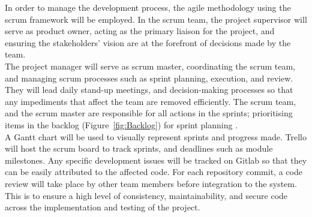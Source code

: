 
In order to manage the development process, the agile methodology using the scrum framework will be employed. In the scrum team, the project supervisor will serve as product owner, acting as the primary liaison for the project, and ensuring the stakeholders' vision are at the forefront of decisions made by the team.\\

The project manager will serve as scrum master, coordinating the scrum team, and managing scrum processes such as sprint planning, execution, and review. They will lead daily stand-up meetings, and decision-making processes so that any impediments that affect the team are removed efficiently. The scrum team, and the scrum master are responsible for all actions in the sprints; prioritising items in the backlog (Figure~\ref{fig:Backlog}) for sprint planning \cite{scrumroles}.\\

A Gantt chart will be used to visually represent sprints and progress made. Trello will host the scrum board to track sprints, and deadlines such as module milestones. Any specific development issues will be tracked on Gitlab so that they can be easily attributed to the affected code. For each repository commit, a code review will take place by other team members before integration to the system. This is to ensure a high level of consistency, maintainability, and secure code across the implementation and testing of the project. 